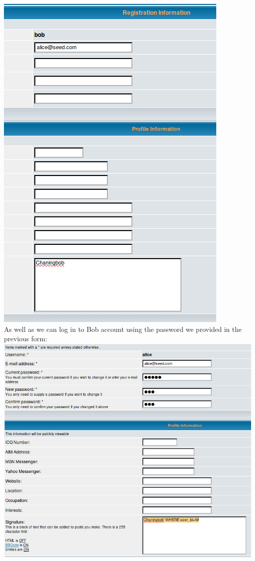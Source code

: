 \documentclass[12pt, a4paper, pdflatex]{article}
\begin{document}
\includegraphics[]{gfx/sql/changed_bob.png}\\
As well as we can log in to Bob account using the password we provided in the previous form:\\
\includegraphics[]{gfx/sql/chainging_alice.png}\\
\end{document}
